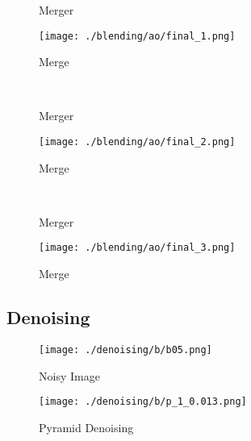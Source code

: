 \documentclass{article}
\begin{document}
    \begin{figure}[!htb]
      \caption{Merger}
    \endminipage \hfill
      \texttt{[image: ./blending/ao/final\_1.png]}
      \caption{Merge}
    \endminipage \hfill
    \end{figure}
    
    \phantom{}\\
    \pagebreak
    
    \begin{figure}[!htb]
      \caption{Merger}
    \endminipage \hfill
      \texttt{[image: ./blending/ao/final\_2.png]}
      \caption{Merge}
    \endminipage \hfill
    \end{figure}

    \phantom{}\\
    
    \begin{figure}[!htb]
      \caption{Merger}
    \endminipage \hfill
      \texttt{[image: ./blending/ao/final\_3.png]}
      \caption{Merge}
    \endminipage \hfill
    \end{figure}
    
    \phantom{}
    
    \pagebreak
    
    \subsection*{Denoising}
    


    \begin{figure}[!htb]
      \texttt{[image: ./denoising/b/b05.png]}
      \caption{Noisy Image}
    \endminipage \hfill
      \texttt{[image: ./denoising/b/p\_1\_0.013.png]}
      \caption{Pyramid Denoising}
    \endminipage
    \end{figure}
    
\end{document}

